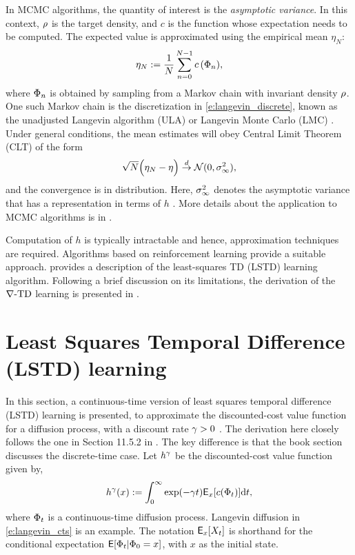 In MCMC algorithms, the quantity of interest is the \textit{asymptotic variance}. In this context, $\rho$ is the target density, and $c$ is the function whose expectation needs to be computed. The expected value is approximated using the empirical mean $\eta_N$:
\[ \eta_N := \frac{1}{N} \sum_{n=0}^{N-1} c\,(\Phi_n),\]
where $\Phi_n$ is obtained by sampling from a Markov chain with invariant density $\rho$. One such Markov chain is the discretization in \eqref{e:langevin_discrete}, known as the unadjusted Langevin algorithm (ULA) or Langevin Monte Carlo (LMC) \cite{}. Under general conditions, the mean estimates will obey Central Limit Theorem (CLT) of the form
\[
\sqrt{N} \Bigl( \eta_N - \eta \Bigr) \overset{d}{\to} \mathcal{N}(0,\sigma_\infty ^2),
\]
and the convergence is in distribution. Here, $\sigma_\infty^2$ denotes the asymptotic variance that has a representation in terms of $h$ \cite{glymey96a,MT,asmgly07}. More details about the application to MCMC algorithms is in \Chapter{}. 

Computation of $h$ is typically intractable and hence, approximation techniques are required. Algorithms based on reinforcement learning provide a suitable approach.  provides a description of the least-squares TD (LSTD) learning algorithm. Following a brief discussion on its limitations,  the derivation of the $\nabla\text{-TD}$ learning is presented in . 

\section{Least Squares Temporal Difference (LSTD) learning} 
In this section, a continuous-time version of least squares temporal difference (LSTD) learning is presented, to approximate the discounted-cost value function for a diffusion process, with a discount rate $\gamma  >0$ \cite{brabar96}. The derivation here closely follows the one in Section 11.5.2 in \cite{ctcn}. The key difference is that the book section discusses the discrete-time case. Let $h^\gamma$ be the discounted-cost value function given by,
\begin{equation}
h^\discount(x) := \int_0^\infty \exp(-\discount t )\Expect_x[c(\markovstate_t)] \ud t, 
\label{e:discount_value_fn}
\end{equation}
where $\Phi_t$ is a continuous-time diffusion process. Langevin diffusion in \eqref{e:langevin_cts} is an example. The notation ${\sf E}_x[X_t]$ is shorthand for the conditional expectation ${\sf E}[\Phi_t|\Phi_0 = x]$, with $x$ as the initial state. 

